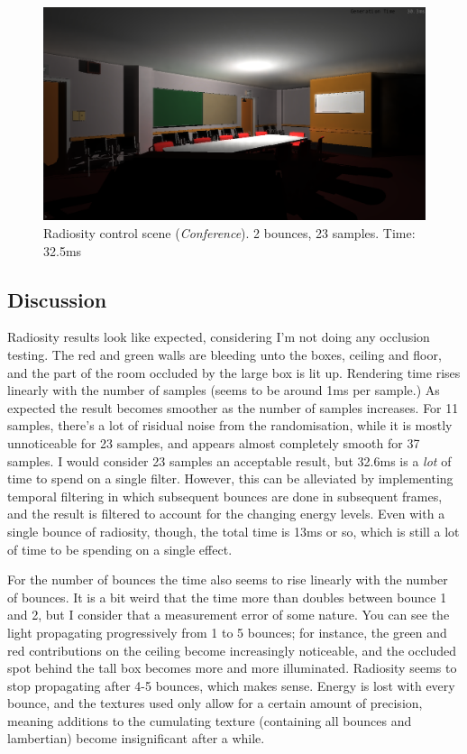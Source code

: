 \begin{figure}[!ht]
\centering
\includegraphics[scale=0.3]{img/results/radiosity/comparison}
\caption{Radiosity control scene (\emph{Conference}). 2 bounces, 23 samples. Time: 32.5ms}
\label{fig-rad-comparison}
\end{figure}

\subsection{Discussion}
Radiosity results look like expected, considering I'm not doing any occlusion testing. The red and green walls are bleeding unto the boxes, ceiling and floor, and the part of the room occluded by the large box is lit up. Rendering time rises linearly with the number of samples (seems to be around 1ms per sample.) As expected the result becomes smoother as the number of samples increases. For 11 samples, there's a lot of risidual noise from the randomisation, while it is mostly unnoticeable for 23 samples, and appears almost completely smooth for 37 samples. I would consider 23 samples an acceptable result, but 32.6ms is a \emph{lot} of time to spend on a single filter. However, this can be alleviated by implementing temporal filtering in which subsequent bounces are done in subsequent frames, and the result is filtered to account for the changing energy levels. Even with a single bounce of radiosity, though, the total time is 13ms or so, which is still a lot of time to be spending on a single effect.

For the number of bounces the time also seems to rise linearly with the number of bounces. It is a bit weird that the time more than doubles between bounce 1 and 2, but I consider that a measurement error of some nature. You can see the light propagating progressively from 1 to 5 bounces; for instance, the green and red contributions on the ceiling become increasingly noticeable, and the occluded spot behind the tall box becomes more and more illuminated. Radiosity seems to stop propagating after 4-5 bounces, which makes sense. Energy is lost with every bounce, and the textures used only allow for a certain amount of precision, meaning additions to the cumulating texture (containing all bounces and lambertian) become insignificant after a while.

